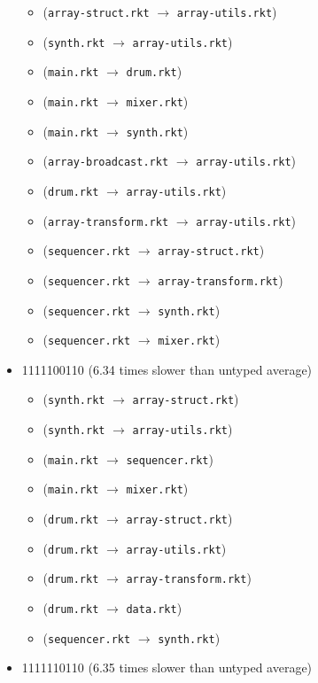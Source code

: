 \documentclass{article}
\newcommand{\mono}[1]{\texttt{#1}}
\begin{document}
\begin{itemize}
\begin{itemize}
  \item (\mono{array-struct.rkt} $\rightarrow$ \mono{array-utils.rkt})
  \item (\mono{synth.rkt} $\rightarrow$ \mono{array-utils.rkt})
  \item (\mono{main.rkt} $\rightarrow$ \mono{drum.rkt})
  \item (\mono{main.rkt} $\rightarrow$ \mono{mixer.rkt})
  \item (\mono{main.rkt} $\rightarrow$ \mono{synth.rkt})
  \item (\mono{array-broadcast.rkt} $\rightarrow$ \mono{array-utils.rkt})
  \item (\mono{drum.rkt} $\rightarrow$ \mono{array-utils.rkt})
  \item (\mono{array-transform.rkt} $\rightarrow$ \mono{array-utils.rkt})
  \item (\mono{sequencer.rkt} $\rightarrow$ \mono{array-struct.rkt})
  \item (\mono{sequencer.rkt} $\rightarrow$ \mono{array-transform.rkt})
  \item (\mono{sequencer.rkt} $\rightarrow$ \mono{synth.rkt})
  \item (\mono{sequencer.rkt} $\rightarrow$ \mono{mixer.rkt})
  \end{itemize}
\item 1111100110 (6.34 times slower than untyped average)
  \begin{itemize}
  \item (\mono{synth.rkt} $\rightarrow$ \mono{array-struct.rkt})
  \item (\mono{synth.rkt} $\rightarrow$ \mono{array-utils.rkt})
  \item (\mono{main.rkt} $\rightarrow$ \mono{sequencer.rkt})
  \item (\mono{main.rkt} $\rightarrow$ \mono{mixer.rkt})
  \item (\mono{drum.rkt} $\rightarrow$ \mono{array-struct.rkt})
  \item (\mono{drum.rkt} $\rightarrow$ \mono{array-utils.rkt})
  \item (\mono{drum.rkt} $\rightarrow$ \mono{array-transform.rkt})
  \item (\mono{drum.rkt} $\rightarrow$ \mono{data.rkt})
  \item (\mono{sequencer.rkt} $\rightarrow$ \mono{synth.rkt})
  \end{itemize}
\item 1111110110 (6.35 times slower than untyped average)
  \begin{itemize}

\end{itemize}
\end{itemize}
\end{document}
